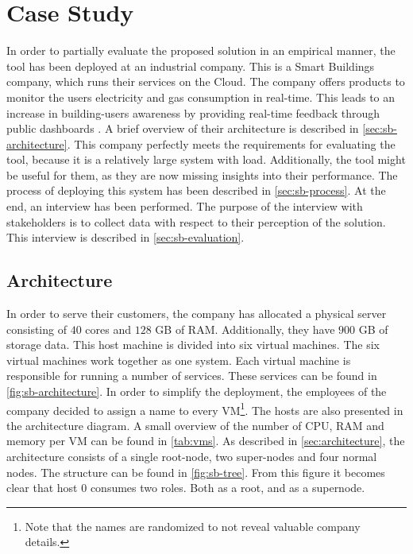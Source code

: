 \chapter{Case Study}\label{ch:case_study}
In order to partially evaluate the proposed solution in an empirical manner, the tool has been deployed at an industrial company. This is a Smart Buildings company, which runs their services on the Cloud. The company offers products to monitor the users electricity and gas consumption in real-time. This leads to an increase in building-users awareness by providing real-time feedback through public dashboards \cite{sb}. A brief overview of their architecture is described in \autoref{sec:sb-architecture}. This company perfectly meets the requirements for evaluating the tool, because it is a relatively large system with load. Additionally, the tool might be useful for them, as they are now missing insights into their performance. The process of deploying this system has been described in \autoref{sec:sb-process}. At the end, an interview has been performed. The purpose of the interview with stakeholders is to collect data with respect to their perception of the solution. This interview is described in \autoref{sec:sb-evaluation}.

\section{Architecture} \label{sec:sb-architecture}
In order to serve their customers, the company has allocated a physical server consisting of $40$ cores and $128$ GB of RAM. Additionally, they have $900$ GB of storage data. This host machine is divided into six virtual machines. The six virtual machines work together as one system. Each virtual machine is responsible for running a number of services. These services can be found in \autoref{fig:sb-architecture}. In order to simplify the deployment, the employees of the company decided to assign a name to every VM\footnote{Note that the names are randomized to not reveal valuable company details.}. The hosts are also presented in the architecture diagram. A small overview of the number of CPU, RAM and memory per VM can be found in \autoref{tab:vms}. As described in \autoref{sec:architecture}, the architecture consists of a single root-node, two super-nodes and four normal nodes. The structure can be found in \autoref{fig:sb-tree}. From this figure it becomes clear that host $0$ consumes two roles. Both as a root, and as a supernode.


